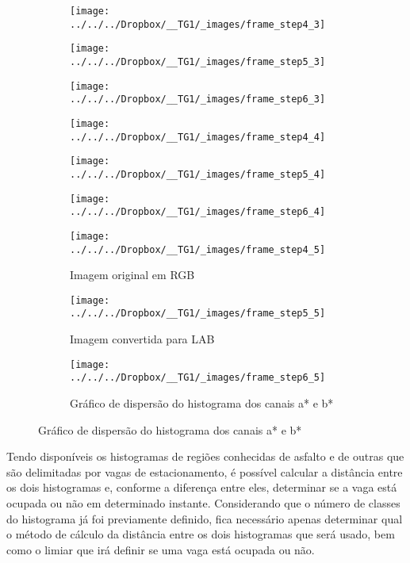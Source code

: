 \documentclass[ecp,tc]{iiufrgs}
\begin{document}
\begin{figure}[h]
	\centering
	\caption{Sequência para cálculo de histograma: Piso}
	\begin{subfigure}[b]{0.3\textwidth}
		\texttt{[image: ../../../Dropbox/\_\_TG1/\_images/frame\_step4\_3]}
		\label{}
	\end{subfigure}
	\quad
	\begin{subfigure}[b]{0.3\textwidth}
		\texttt{[image: ../../../Dropbox/\_\_TG1/\_images/frame\_step5\_3]}
		\label{}
	\end{subfigure}
	\quad
	\begin{subfigure}[b]{0.3\textwidth}
		\texttt{[image: ../../../Dropbox/\_\_TG1/\_images/frame\_step6\_3]}
		\label{}
	\end{subfigure}
	\hfill
	\begin{subfigure}[b]{0.3\textwidth}
		\texttt{[image: ../../../Dropbox/\_\_TG1/\_images/frame\_step4\_4]}
		\label{}
	\end{subfigure}
	\quad
	\begin{subfigure}[b]{0.3\textwidth}
		\texttt{[image: ../../../Dropbox/\_\_TG1/\_images/frame\_step5\_4]}
		\label{}
	\end{subfigure}
	\quad
	\begin{subfigure}[b]{0.3\textwidth}
		\texttt{[image: ../../../Dropbox/\_\_TG1/\_images/frame\_step6\_4]}
		\label{}
	\end{subfigure}
	\hfill
	\begin{subfigure}[b]{0.3\textwidth}
		\texttt{[image: ../../../Dropbox/\_\_TG1/\_images/frame\_step4\_5]}
		\label{}
		\caption{Imagem original em RGB \linebreak}
	\end{subfigure}
	\quad
	\begin{subfigure}[b]{0.3\textwidth}
		\texttt{[image: ../../../Dropbox/\_\_TG1/\_images/frame\_step5\_5]}
		\label{}
		\caption{Imagem convertida para LAB}
	\end{subfigure}
	\quad
	\begin{subfigure}[b]{0.3\textwidth}
		\texttt{[image: ../../../Dropbox/\_\_TG1/\_images/frame\_step6\_5]}
		\label{}
		\caption{Gráfico de dispersão do histograma dos canais a* e b*}
	\end{subfigure}
	\label{fig:histasf}
\end{figure}

Tendo disponíveis os histogramas de regiões conhecidas de asfalto e de outras que são delimitadas por vagas de estacionamento, é possível calcular a distância entre os dois histogramas e, conforme a diferença entre eles, determinar se a vaga está ocupada ou não em determinado instante. Considerando que o número de classes do histograma já foi previamente definido, fica necessário apenas determinar qual o método de cálculo da distância entre os dois histogramas que será usado, bem como o limiar que irá definir se uma vaga está ocupada ou não.
\end{document}
